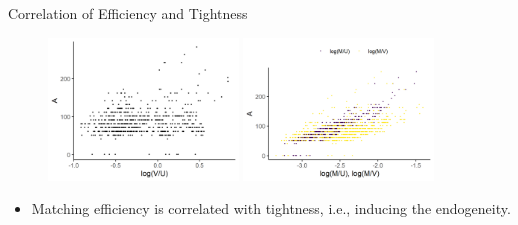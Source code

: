 \documentclass[aspectratio=169]{beamer}
\begin{document}
\begin{frame}{Correlation of Efficiency and Tightness}
    \begin{figure}[!ht]
  \begin{center}
  \includegraphics[width = 0.45\textwidth]
  {figuretable/efficiency_tightness_plot_month_aggregate.png}
  \includegraphics[width = 0.45\textwidth]
  {figuretable/job_finding_rate_efficiency_plot_month_aggregate.png}
  \end{center}
  \footnotesize
\end{figure} 
\begin{itemize}
    \item Matching efficiency is correlated with tightness, i.e., inducing the endogeneity.
\end{itemize}
\end{frame}
\end{document}
